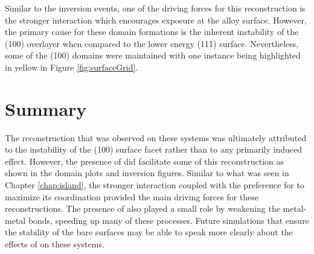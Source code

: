 Similar to the inversion events, one of the driving forces for this
reconstruction is the stronger  interaction which encourages
 exposure at the alloy surface. However, the primary cause for these
domain formations is the inherent instability of the (100) overlayer when
compared to the lower energy (111) surface. Nevertheless, some of the (100)
domains were maintained with one instance being highlighted in yellow in Figure
\ref{fig:surfaceGrid}.


\section{Summary}
The reconstruction that was observed on these systems was ultimately attributed
to the instability of the (100) surface facet rather than to any primarily
 induced effect. However, the presence of  did facilitate some of
this reconstruction as shown in the domain plots and inversion figures. Similar
to what was seen in Chapter \ref{chap:island}, the stronger 
interaction coupled with the preference for  to maximize its coordination
provided the main driving forces for these reconstructions. The
presence of  also played a small role by weakening the metal-metal
bonds, speeding up many of these processes. Future simulations that ensure the
stability of the bare surfaces may be able to speak more clearly about the
effects of  on these systems.

